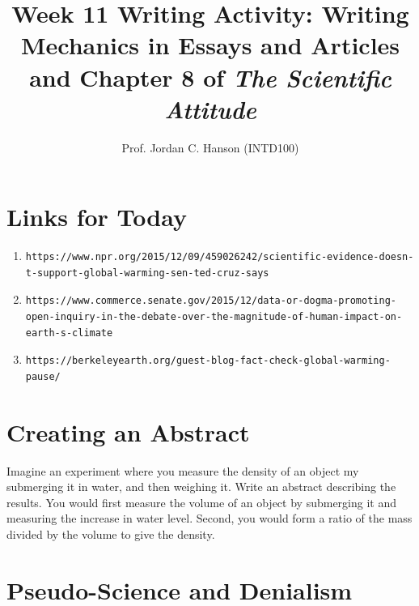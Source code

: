 \documentclass{article}
\begin{document}
\title{Week 11 Writing Activity: Writing Mechanics in Essays and Articles and Chapter 8 of \textit{The Scientific Attitude}}
\author{Prof. Jordan C. Hanson (INTD100)}

\maketitle

\section{Links for Today}
\small
\begin{enumerate}
\item
\begin{verbatim}
https://www.npr.org/2015/12/09/459026242/scientific-evidence-doesn-t-support-global-warming-sen-ted-cruz-says
\end{verbatim}
\item
\begin{verbatim}
https://www.commerce.senate.gov/2015/12/data-or-dogma-promoting-
open-inquiry-in-the-debate-over-the-magnitude-of-human-impact-on-earth-s-climate
\end{verbatim}
\item
\begin{verbatim}
https://berkeleyearth.org/guest-blog-fact-check-global-warming-pause/
\end{verbatim}
\end{enumerate}

\section{Creating an Abstract}
\normalsize
Imagine an experiment where you measure the density of an object my submerging it in water, and then weighing it.  Write an abstract describing the results.  You would first measure the volume of an object by submerging it and measuring the increase in water level.  Second, you would form a ratio of the mass divided by the volume to give the density.

\section{Pseudo-Science and Denialism}
\end{document}
